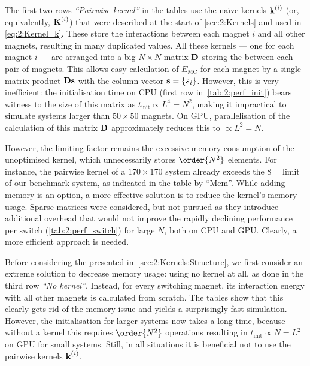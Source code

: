 The first two rows \textit{``Pairwise kernel''} in the tables use the na\"ive kernels $\boldsymbol{\mathbf{k}}^{(i)}$ (or, equivalently, $\boldsymbol{\mathbf{K}}^{(i)}$) that were described at the start of \cref{sec:2:Kernels} and used in \cref{eq:2:Kernel_k}.
These store the interactions between each magnet $i$ and all other magnets, resulting in many duplicated values.
All these kernels --- one for each magnet $i$ --- are arranged into a big $N \times N$ matrix $\boldsymbol{\mathbf{D}}$ storing the  between each pair of magnets.
This allows easy calculation of $E_\mathrm{MC}$ for each magnet by a single matrix product $\boldsymbol{\mathbf{D}}\boldsymbol{\mathbf{s}}$ with the column vector $\boldsymbol{\mathbf{s}}=\{s_i\}$.
However, this is very inefficient: the initialisation time on CPU (first row in~\cref{tab:2:perf_init}) bears witness to the size of this matrix as $t_\mathrm{init} \propto L^4 = N^2$, making it impractical to simulate systems larger than $50 \times 50$ magnets.
On GPU, parallelisation of the calculation of this matrix $\boldsymbol{\mathbf{D}}$ approximately reduces this to $\propto L^2 = N$. \par
However, the limiting factor remains the excessive memory consumption of the unoptimised kernel, which unnecessarily stores $\order{N^2}$ elements. %
For instance, the pairwise kernel of a $170 \times 170$ system already exceeds the \SI{8}{\giga\byte} limit of our benchmark system, as indicated in the table by ``Mem''.
While adding memory is an option, a more effective solution is to reduce the kernel's memory usage.
Sparse matrices were considered, but not pursued as they introduce additional overhead that would not improve the rapidly declining performance per switch (\cref{tab:2:perf_switch}) for large $N$, both on CPU and GPU. %
Clearly, a more efficient approach is needed. \\\par

Before considering the  presented in~\cref{sec:2:Kernels:Structure}, we first consider an extreme solution to decrease memory usage: using no kernel at all, as done in the third row \textit{``No kernel''}.
Instead, for every switching magnet, its interaction energy with all other magnets is calculated from scratch.
The tables show that this clearly gets rid of the memory issue and yields a surprisingly fast simulation.
However, the initialisation for larger systems now takes a long time, because without a kernel this requires $\order{N^2}$ operations resulting in $t_\mathrm{init} \propto N=L^2$ on GPU for small systems.
Still, in all situations it is beneficial not to use the pairwise kernels $\boldsymbol{\mathbf{k}}^{(i)}$. \\\par

